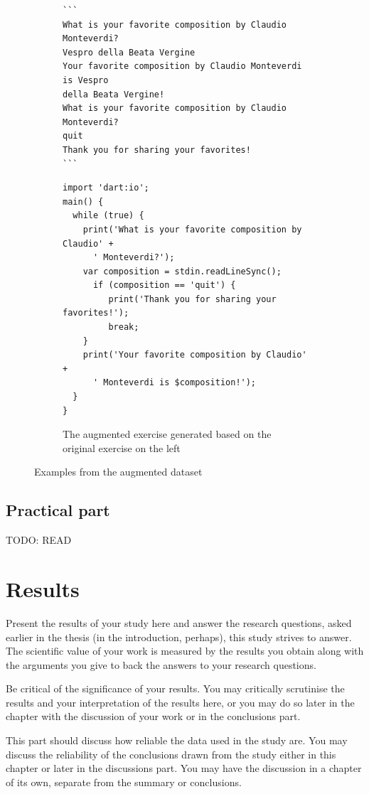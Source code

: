 \documentclass[english, 12pt, a4paper, sci, utf8, a-2b, online]{../definitions/aaltothesis}
\begin{document}
\begin{figure}
\begin{subfigure}[b]{0.5\textwidth}
\begin{verbatim}
```
What is your favorite composition by Claudio Monteverdi?
Vespro della Beata Vergine
Your favorite composition by Claudio Monteverdi is Vespro
della Beata Vergine!
What is your favorite composition by Claudio Monteverdi?
quit
Thank you for sharing your favorites!
``` 
\end{verbatim}
\begin{verbatim}
import 'dart:io';
main() {
  while (true) {
    print('What is your favorite composition by Claudio' + 
      ' Monteverdi?');
    var composition = stdin.readLineSync();
	  if (composition == 'quit') {
	     print('Thank you for sharing your favorites!');
	     break; 
    }
    print('Your favorite composition by Claudio' + 
      ' Monteverdi is $composition!');
  }
}
\end{verbatim}
    \caption{The augmented exercise generated based on the original exercise on the left}
    \label{fig:ag_ex}
    \end{subfigure}
    \caption{Examples from the augmented dataset}
\end{figure}

\clearpage

\subsection{Practical part}

TODO: READ \cite{alazraki-etal-2025-need, cobbina2025demospromptpositionalbias, chen-etal-2023-many, chen-etal-2023-relation}

\clearpage

\section{Results}

Present the results of your study here and answer the research questions, asked 
earlier in the thesis (in the introduction, perhaps), this study strives to 
answer. The scientific value of your work is measured by the results you obtain 
along with the arguments you give to back the answers to your research 
questions.

Be critical of the significance of your results. You may critically scrutinise 
the results and your interpretation of the results here, or you may do so later 
in the chapter with the discussion of your work or in the conclusions part.

This part should discuss how reliable the data used in the study are. You may 
discuss the reliability of the conclusions drawn from the study either in this 
chapter or later in the discussions part. You may have the discussion in a 
chapter of its own, separate from the summary or conclusions.
\end{document}

